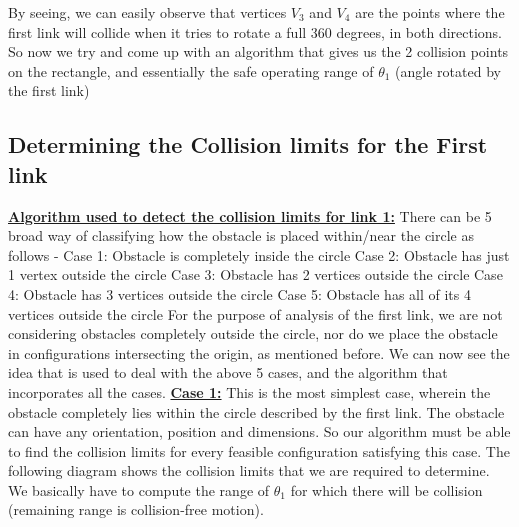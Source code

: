 \documentclass[12pt]{article}
\begin{document}
By seeing, we can easily observe that vertices $V_3$ and $V_4$ are the points where the first link will collide when it tries to rotate a full 360 degrees, in both directions. So now we try and come up with an algorithm that gives us the 2 collision points on the rectangle, and essentially the safe operating range of $\theta_1$ (angle rotated by the first link)
\clearpage
\subsection{Determining the Collision limits for the First link}
\underline{\textbf{Algorithm used to detect the collision limits for link 1:}}
\newline
\newline
There can be 5 broad way of classifying how the obstacle is placed within/near the circle as follows - 
\newline
Case 1: Obstacle is completely inside the circle
\newline
Case 2: Obstacle has just 1 vertex outside the circle
\newline
Case 3: Obstacle has 2 vertices outside the circle
\newline
Case 4: Obstacle has 3 vertices outside the circle
\newline
Case 5: Obstacle has all of its 4 vertices outside the circle
\newline
For the purpose of analysis of the first link, we are not considering obstacles completely outside the circle, nor do we place the obstacle in configurations intersecting the origin, as mentioned before. We can now see the idea that is used to deal with the above 5 cases, and the algorithm that incorporates all the cases.
\newline
\newline
\underline{\textbf{Case 1:}}
\newline
This is the most simplest case, wherein the obstacle completely lies within the circle described by the first link. The obstacle can have any orientation, position and dimensions. So our algorithm must be able to find the collision limits for every feasible configuration satisfying this case. The following diagram shows the collision limits that we are required to determine. We basically have to compute the range of $\theta_1$ for which there will be collision (remaining range is collision-free motion).
\end{document}
